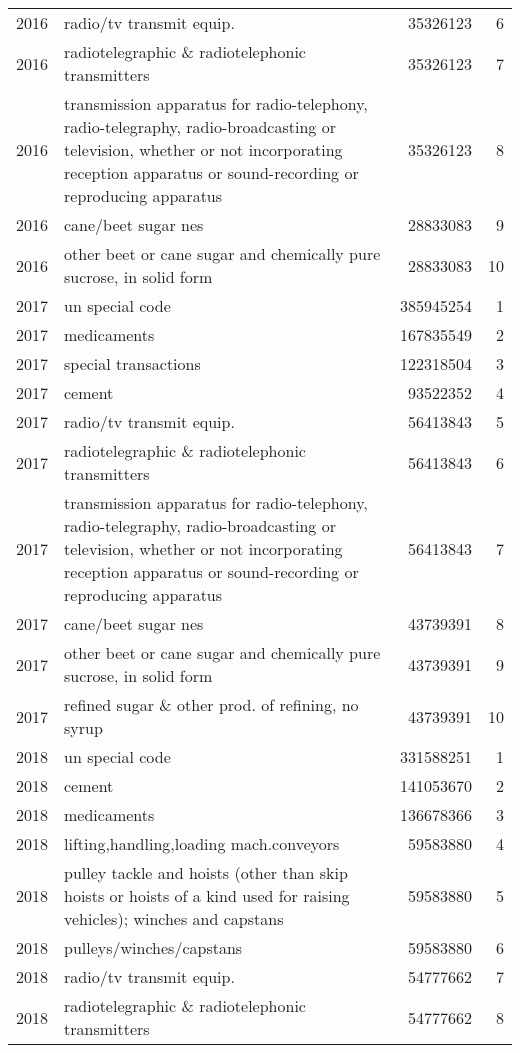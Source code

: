 \begin{longtable}{rlrr}
2016 & radio/tv transmit equip. & 35326123 & 6 \\ 
2016 & radiotelegraphic \& radiotelephonic transmitters & 35326123 & 7 \\ 
2016 & transmission apparatus for radio-telephony, radio-telegraphy, radio-broadcasting or television, whether or not incorporating reception apparatus or sound-recording or reproducing apparatus & 35326123 & 8 \\ 
2016 & cane/beet sugar nes & 28833083 & 9 \\ 
2016 & other beet or cane sugar and chemically pure sucrose, in solid form & 28833083 & 10 \\ 
2017 & un special code & 385945254 & 1 \\ 
2017 & medicaments & 167835549 & 2 \\ 
2017 & special transactions & 122318504 & 3 \\ 
2017 & cement & 93522352 & 4 \\ 
2017 & radio/tv transmit equip. & 56413843 & 5 \\ 
2017 & radiotelegraphic \& radiotelephonic transmitters & 56413843 & 6 \\ 
2017 & transmission apparatus for radio-telephony, radio-telegraphy, radio-broadcasting or television, whether or not incorporating reception apparatus or sound-recording or reproducing apparatus & 56413843 & 7 \\ 
2017 & cane/beet sugar nes & 43739391 & 8 \\ 
2017 & other beet or cane sugar and chemically pure sucrose, in solid form & 43739391 & 9 \\ 
2017 & refined sugar \& other prod. of refining, no syrup & 43739391 & 10 \\ 
2018 & un special code & 331588251 & 1 \\ 
2018 & cement & 141053670 & 2 \\ 
2018 & medicaments & 136678366 & 3 \\ 
2018 & lifting,handling,loading mach.conveyors & 59583880 & 4 \\ 
2018 & pulley tackle and hoists (other than skip hoists or hoists of a kind used for raising vehicles); winches and capstans & 59583880 & 5 \\ 
2018 & pulleys/winches/capstans & 59583880 & 6 \\ 
2018 & radio/tv transmit equip. & 54777662 & 7 \\ 
2018 & radiotelegraphic \& radiotelephonic transmitters & 54777662 & 8 \\ 

\end{longtable}
